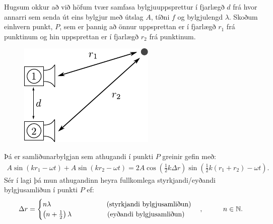 \begin{tcolorbox}
\begin{theorem}
Hugsum okkur að við höfum tvær samfasa bylgjuuppsprettur í fjarlægð $d$ frá hvor annarri sem senda út eins bylgjur með útslag $A$, tíðni $f$ og bylgjulengd $\lambda$. Skoðum einhvern punkt, $P$, sem er þannig að önnur uppsprettan er í fjarlægð $r_1$ frá punktinum og hin uppsprettan er í fjarlægð $r_2$ frá punktinum.
\begin{figure}[H]
    \centering
    \vspace{-0.5cm}
    \includegraphics{figures/hatalari-dist.pdf}
\end{figure}
Þá er samliðunarbylgjan sem athugandi í punkti $P$ greinir gefin með:
\begin{align*} 
A\sin(kr_1-\omega t) + A\sin(kr_2 - \omega t) = 2A\cos(\frac{1}{2}k\Delta r)\sin(\frac{1}{2}k(r_1+r_2)-\omega t).
\end{align*}
Sér í lagi þá mun athugandinn heyra fullkomlega styrkjandi/eyðandi bylgjusamliðun í punkti $P$ ef:
\begin{align*}
    \Delta r = \begin{cases}
    n \lambda \hspace{2.8cm} \text{(styrkjandi bylgjusamliðun)} \\
    \left(n+\frac{1}{2}\right)\lambda \hspace{1.8cm} \text{(eyðandi bylgjusamliðun)}
    \end{cases},\hspace{1cm} n \in \mathbb{N}.
\end{align*}
\end{theorem}
\end{tcolorbox}


